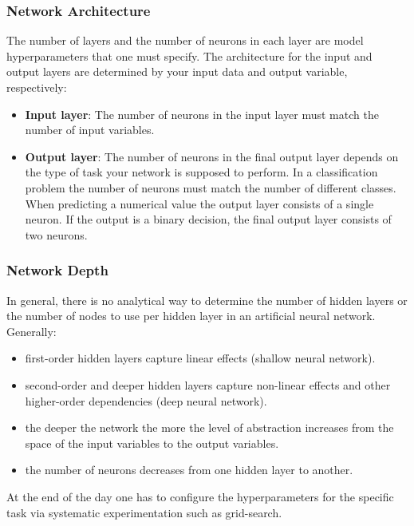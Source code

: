 \documentclass[xcolor=dvipsnames, english, 8pt]{beamer}
\begin{document}
\begin{frame}
    \frametitle{Network Architecture}
    The number of layers and the number of neurons in each layer are model {\color{ubRed}hyperparameters} that one must specify. The architecture for the {\color{green!50}input} and {\color{red!50}output} layers are determined by your input data and output variable, respectively:\vspace{0.25cm}\\
    \begin{itemize}
        \item {\color{green!50}\textbf{Input layer}}: The number of neurons in the input layer must match the number of input variables.
        \item {\color{red!50}\textbf{Output layer}}: The number of neurons in the final output layer depends on the type of task your network is supposed to perform. In a classification problem the number of neurons must match the number of different classes. When predicting a numerical value the output layer consists of a single neuron. If the output is a binary decision, the final output layer consists of two neurons.\vspace{0.25cm}\\
    \end{itemize}
\end{frame}

\begin{frame}
    \frametitle{Network Depth}
    In general, there is no analytical way to determine the number of {\color{blue!50}hidden layers} or the number of nodes to use per {\color{blue!50}hidden layer} in an artificial neural network. Generally:\vspace{0.25cm}\\
    \begin{itemize}
        \item first-order hidden layers capture linear effects (shallow neural network).
        \item second-order and deeper hidden layers capture non-linear effects and other higher-order dependencies (deep neural network).
        \item the deeper the network the more the level of abstraction increases from the space of the input variables to the output variables.
        \item the number of neurons decreases from one hidden layer to another.
\vspace{0.25cm}\\
    \end{itemize}
At the end of the day one has to configure the hyperparameters for the specific task via {\color{ubRed}systematic experimentation} such as {\color{ubRed}grid-search}.
\end{frame}
\end{document}
